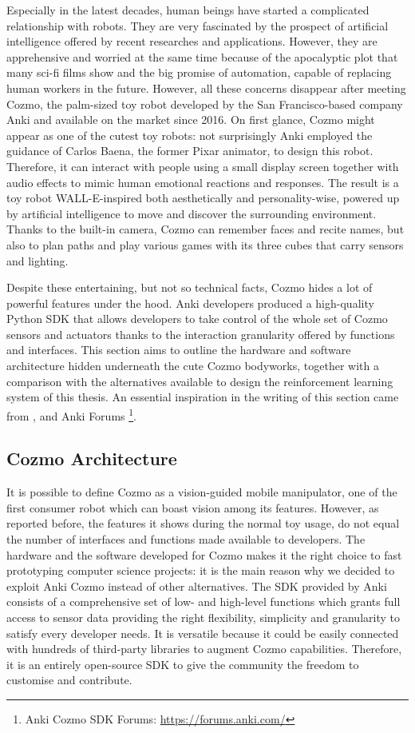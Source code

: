 Especially in the latest decades, human beings have started a complicated relationship with robots.
They are very fascinated by the prospect of artificial intelligence offered by recent researches and applications.
However, they are apprehensive and worried at the same time because of the apocalyptic plot that many sci-fi films show and the big promise of automation, capable of replacing human workers in the future.
However, all these concerns disappear after meeting Cozmo, the palm-sized toy robot developed by the San Francisco-based company Anki and available on the market since 2016.
On first glance, Cozmo might appear as one of the cutest toy robots: not surprisingly Anki employed the guidance of Carlos Baena, the former Pixar animator, to design this robot.
Therefore, it can interact with people using a small display screen together with audio effects to mimic human emotional reactions and responses.
The result is a toy robot WALL-E-inspired both aesthetically and personality-wise, powered up by artificial intelligence to move and discover the surrounding environment.
Thanks to the built-in camera, Cozmo can remember faces and recite names, but also to plan paths and play various games with its three cubes that carry sensors and lighting.

Despite these entertaining, but not so technical facts, Cozmo hides a lot of powerful features under the hood.
Anki developers produced a high-quality Python SDK that allows developers to take control of the whole set of Cozmo sensors and actuators thanks to the interaction granularity offered by functions and interfaces.
This section aims to outline the hardware and software architecture hidden underneath the cute Cozmo bodyworks, together with a comparison with the alternatives available to design the reinforcement learning system of this thesis.
An essential inspiration in the writing of this section came from \cite{mellon2017cognitive}, \cite{touretzky2018cozmopedia} and Anki Forums \footnote{Anki Cozmo SDK Forums: \href{https://forums.anki.com/}{https://forums.anki.com/}}.

\subsection{Cozmo Architecture}

It is possible to define Cozmo as a vision-guided mobile manipulator, one of the first consumer robot which can boast vision among its features.
However, as reported before, the features it shows during the normal toy usage, do not equal the number of interfaces and functions made available to developers.
The hardware and the software developed for Cozmo makes it the right choice to fast prototyping computer science projects: it is the main reason why we decided to exploit Anki Cozmo instead of other alternatives.
The SDK provided by Anki consists of a comprehensive set of low- and high-level functions which grants full access to sensor data providing the right flexibility, simplicity and granularity to satisfy every developer needs.
It is versatile because it could be easily connected with hundreds of third-party libraries to augment Cozmo capabilities.
Therefore, it is an entirely open-source SDK to give the community the freedom to customise and contribute.

